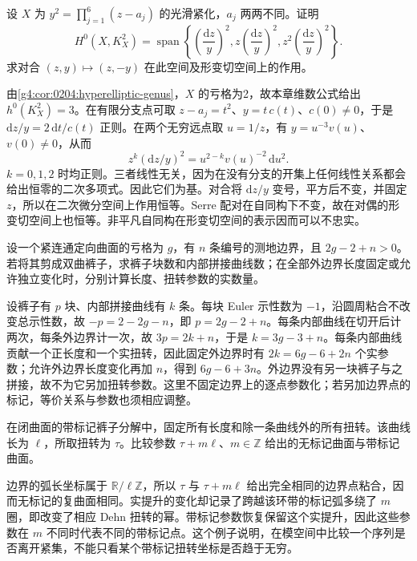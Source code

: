 \begin{exercise}
	设 \(X\) 为 \(y^2=\prod_{j=1}^6(z-a_j)\) 的光滑紧化，\(a_j\) 两两不同。证明
	\[
		H^0(X,K_X^2)=\operatorname{span}\left\{
		\left(\frac{\mathrm{d}z}{y}\right)^2,
		z\left(\frac{\mathrm{d}z}{y}\right)^2,
		z^2\left(\frac{\mathrm{d}z}{y}\right)^2\right\}.
	\]
	求对合 \((z,y)\mapsto(z,-y)\) 在此空间及形变切空间上的作用。
\end{exercise}
\begin{solution}
	由\cref{g4:cor:0204:hyperelliptic-genus}，\(X\) 的亏格为2，故本章维数公式给出 \(h^0(K_X^2)=3\)。在有限分支点可取 \(z-a_j=t^2\)、\(y=t\,c(t)\)、\(c(0)\ne0\)，于是 \(\mathrm{d}z/y=2\,\mathrm{d}t/c(t)\) 正则。在两个无穷远点取 \(u=1/z\)，有 \(y=u^{-3}v(u)\)、\(v(0)\ne0\)，从而
	\[
		z^k(\mathrm{d}z/y)^2=u^{2-k}v(u)^{-2}\,\mathrm{d}u^2.
	\]
	\(k=0,1,2\) 时均正则。三者线性无关，因为在没有分支的开集上任何线性关系都会给出恒零的二次多项式。因此它们为基。对合将 \(\mathrm{d}z/y\) 变号，平方后不变，并固定 \(z\)，所以在二次微分空间上作用恒等。Serre 配对在自同构下不变，故在对偶的形变切空间上也恒等。非平凡自同构在形变切空间的表示因而可以不忠实。
\end{solution}

\begin{exercise}
	设一个紧连通定向曲面的亏格为 \(g\)，有 \(n\) 条编号的测地边界，且 \(2g-2+n>0\)。若将其剪成双曲裤子，求裤子块数和内部拼接曲线数；在全部外边界长度固定或允许独立变化时，分别计算长度、扭转参数的实数量。
\end{exercise}
\begin{solution}
	设裤子有 \(p\) 块、内部拼接曲线有 \(k\) 条。每块 Euler 示性数为 \(-1\)，沿圆周粘合不改变总示性数，故 \(-p=2-2g-n\)，即 \(p=2g-2+n\)。每条内部曲线在切开后计两次，每条外边界计一次，故 \(3p=2k+n\)，于是 \(k=3g-3+n\)。每条内部曲线贡献一个正长度和一个实扭转，因此固定外边界时有 \(2k=6g-6+2n\) 个实参数；允许外边界长度变化再加 \(n\)，得到 \(6g-6+3n\)。外边界没有另一块裤子与之拼接，故不为它另加扭转参数。这里不固定边界上的逐点参数化；若另加边界点的标记，等价关系与参数也须相应调整。
\end{solution}

\begin{exercise}
	在闭曲面的带标记裤子分解中，固定所有长度和除一条曲线外的所有扭转。该曲线长为 \(\ell\)，所取扭转为 \(\tau\)。比较参数 \(\tau+m\ell\)、\(m\in\mathbb Z\) 给出的无标记曲面与带标记曲面。
\end{exercise}
\begin{solution}
	边界的弧长坐标属于 \(\mathbb R/\ell\mathbb Z\)，所以 \(\tau\) 与 \(\tau+m\ell\) 给出完全相同的边界点粘合，因而无标记的复曲面相同。实提升的变化却记录了跨越该环带的标记弧多绕了 \(m\) 圈，即改变了相应 Dehn 扭转的幂。带标记参数恢复保留这个实提升，因此这些参数在 \(m\) 不同时代表不同的带标记点。这个例子说明，在模空间中比较一个序列是否离开紧集，不能只看某个带标记扭转坐标是否趋于无穷。
\end{solution}

